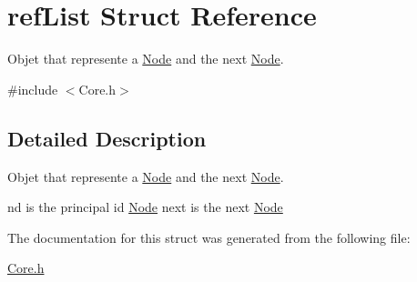 \hypertarget{structrefList}{\section{ref\-List Struct Reference}
\label{structrefList}
}


Objet that represente a \hyperlink{structNode}{Node} and the next \hyperlink{structNode}{Node}.  




{\ttfamily \#include $<$Core.\-h$>$}



\subsection{Detailed Description}
Objet that represente a \hyperlink{structNode}{Node} and the next \hyperlink{structNode}{Node}. 

nd is the principal id \hyperlink{structNode}{Node} next is the next \hyperlink{structNode}{Node} 

The documentation for this struct was generated from the following file\-:\begin{DoxyCompactItemize}
\item 
\hyperlink{Core_8h}{Core.\-h}\end{DoxyCompactItemize}
